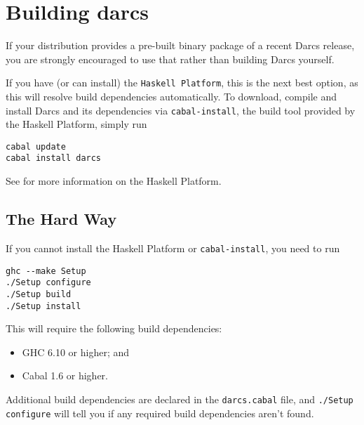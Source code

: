\chapter{Building darcs}
If your distribution provides a pre-built binary package of a recent
Darcs release, you are strongly encouraged to use that rather than
building Darcs yourself.

If you have (or can install) the \texttt{Haskell Platform}, this
is the next best option, as this will resolve build dependencies
automatically.  To download, compile and install Darcs and its
dependencies via \texttt{cabal-install}, the build tool provided by the
Haskell Platform, simply run
\begin{verbatim}
cabal update
cabal install darcs
\end{verbatim}

See 
for more information on the Haskell Platform.

\section{The Hard Way}
If you cannot install the Haskell Platform or \texttt{cabal-install}, you need to run
\begin{verbatim}
ghc --make Setup
./Setup configure
./Setup build
./Setup install
\end{verbatim}

This will require the following build dependencies:
\begin{itemize}
\item GHC 6.10 or higher; and
\item Cabal 1.6 or higher.
\end{itemize}

Additional build dependencies are declared in the \texttt{darcs.cabal}
file, and \texttt{./Setup configure} will tell you if any required
build dependencies aren't found.
